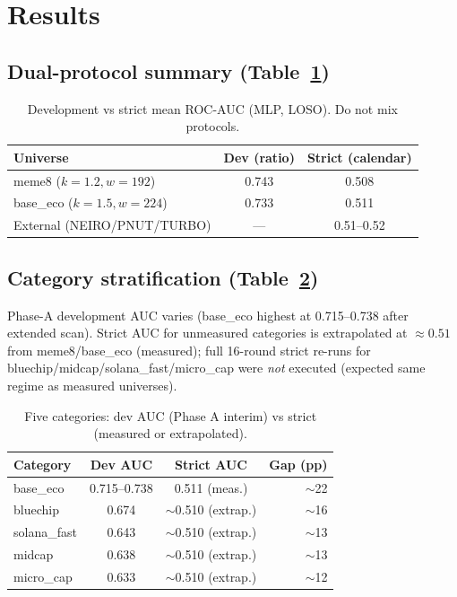 \documentclass[11pt,a4paper]{article}
\begin{document}
\section{Results}

\subsection{Dual-protocol summary (Table~\ref{tab:dual})}
\begin{table}[h]
\centering
\caption{Development vs strict mean ROC-AUC (MLP, LOSO). Do not mix protocols.}
\label{tab:dual}
\begin{tabular}{lcc}
\toprule
Universe & Dev (ratio) & Strict (calendar) \\
\midrule
meme8 ($k{=}1.2, w{=}192$) & 0.743 & 0.508 \\
base\_eco ($k{=}1.5, w{=}224$) & 0.733 & 0.511 \\
External (NEIRO/PNUT/TURBO) & --- & 0.51--0.52 \\
\bottomrule
\end{tabular}
\end{table}

\subsection{Category stratification (Table~\ref{tab:cat})}
Phase-A development AUC varies (base\_eco highest at 0.715--0.738 after extended scan).
Strict AUC for unmeasured categories is extrapolated at $\approx 0.51$ from meme8/base\_eco
(measured); full 16-round strict re-runs for bluechip/midcap/solana\_fast/micro\_cap were
\emph{not} executed (expected same regime as measured universes).

\begin{table}[h]
\centering
\caption{Five categories: dev AUC (Phase A interim) vs strict (measured or extrapolated).}
\label{tab:cat}
\begin{tabular}{lccr}
\toprule
Category & Dev AUC & Strict AUC & Gap (pp) \\
\midrule
base\_eco & 0.715--0.738 & 0.511 (meas.) & $\sim$22 \\
bluechip & 0.674 & $\sim$0.510 (extrap.) & $\sim$16 \\
solana\_fast & 0.643 & $\sim$0.510 (extrap.) & $\sim$13 \\
midcap & 0.638 & $\sim$0.510 (extrap.) & $\sim$13 \\
micro\_cap & 0.633 & $\sim$0.510 (extrap.) & $\sim$12 \\
\bottomrule
\end{tabular}
\end{table}
\end{document}

